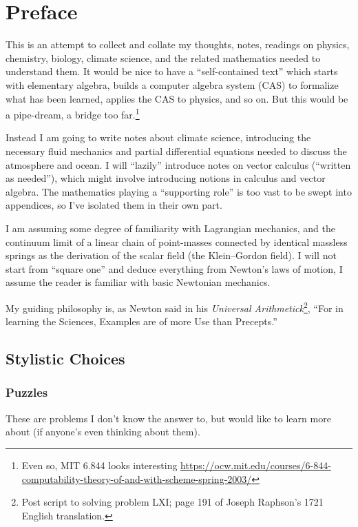 \chapter*{Preface}

This is an attempt to collect and collate my thoughts, notes, readings
on physics, chemistry, biology, climate science, and the related
mathematics needed to understand them. It would be nice to have a
``self-contained text'' which starts with elementary algebra, builds a
computer algebra system (CAS) to formalize what has been learned,
applies the CAS to physics, and so on. But this would be a pipe-dream, a
bridge too far.\footnote{Even so, MIT 6.844 looks interesting \url{https://ocw.mit.edu/courses/6-844-computability-theory-of-and-with-scheme-spring-2003/}}

Instead I am going to write notes about climate science, introducing the
necessary fluid mechanics and partial differential equations needed to
discuss the atmosphere and ocean. I will ``lazily'' introduce notes on
vector calculus (``written as needed''), which might involve introducing
notions in calculus and vector algebra. The mathematics playing a
``supporting role'' is too vast to be swept into appendices, so I've
isolated them in their own part.

I am assuming some degree of familiarity with Lagrangian mechanics, and
the continuum limit of a linear chain of point-masses connected by
identical massless springs as the derivation of the scalar field (the
Klein--Gordon field). I will not start from ``square one'' and deduce
everything from Newton's laws of motion, I assume the reader is familiar
with basic Newtonian mechanics.

My guiding philosophy is, as Newton said in his \textit{Universal Arithmetick}\footnote{Post script to solving problem LXI; page 191 of Joseph Raphson's 1721 English translation.},
``For in learning the Sciences, Examples are of more Use than
Precepts.''

\section*{Stylistic Choices}

\subsection*{Puzzles} These are problems I don't know the answer to, but
would like to learn more about (if anyone's even thinking about them).

